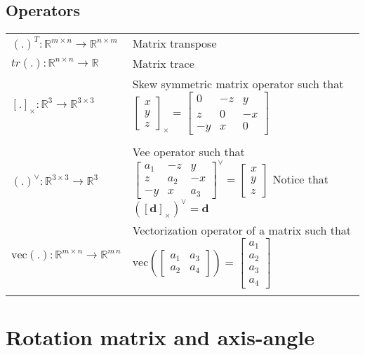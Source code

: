 \documentclass{article}
\renewcommand\skew[1]{[#1]_{\times}}
\newcommand\Real{\mathbb{R}}
\newcommand\vecop[1]{\text{vec} \left( #1\right)}
\begin{document}
\subsection{Operators}
\begin{tabular}{l p{15cm}}
  $ (.)^T : \Real^{m \times n} \to \Real^{n \times m}$ & Matrix transpose \\
  $tr(.) : \Real^{n \times n} \to \Real$ & Matrix trace \\
  $\skew{.} : \Real^3 \to  \Real^{3\times 3}$ & Skew symmetric matrix operator such that
  $\begin{bmatrix} x \\ y \\ z \end{bmatrix}_\times =
  \begin{bmatrix}
    0& - z & y \\ 
    z & 0 & -x \\
    -y & x & 0
  \end{bmatrix}$ \\ [10pt] \\
  $(.)^\vee : \Real^{3 \times 3} \to \Real^{3}$ & Vee operator such that
  $\begin{bmatrix}
    a_1& - z & y \\ 
    z & a_2 & -x \\
    -y & x & a_3
  \end{bmatrix}^\vee = \begin{bmatrix} x \\ y \\ z \end{bmatrix}$ \newline Notice that $\left(\skew{\bm{d}}\right)^\vee = \bm{d}$ \\
    $\vecop{.} : \Real^{m \times n} \to \Real^{m\,n}$ & Vectorization operator of a matrix such that
   $\vecop{\begin{bmatrix}
    a_1 & a_3 \\ 
    a_2 & a_4
    \end{bmatrix}} = \begin{bmatrix} a_1 \\ a_2 \\ a_3 \\ a_4 \end{bmatrix}$ \\ [10pt] \\
\end{tabular}

\section{Rotation matrix and axis-angle}
\end{document}
